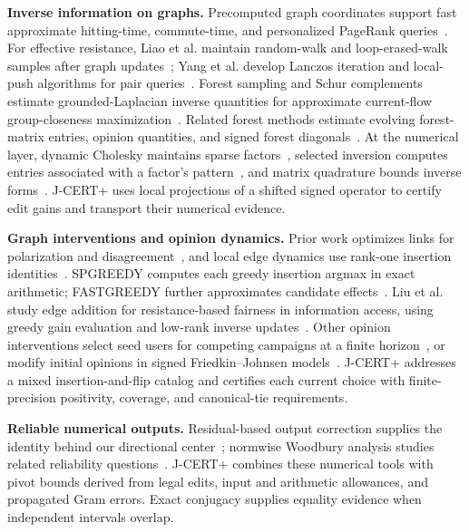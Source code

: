 \textbf{Inverse information on graphs.} Precomputed graph coordinates support fast approximate hitting-time, commute-time, and personalized PageRank queries~\cite{zhao2013randomwalk}. For effective resistance, Liao et al. maintain random-walk and loop-erased-walk samples after graph updates~\cite{liao2025resistance}; Yang et al. develop Lanczos iteration and local-push algorithms for pair queries~\cite{yang2026resistance}. Forest sampling and Schur complements estimate grounded-Laplacian inverse quantities for approximate current-flow group-closeness maximization~\cite{xia2025groupcloseness}. Related forest methods estimate evolving forest-matrix entries, opinion quantities, and signed forest diagonals~\cite{sun2024evolving,sun2025opinion,sun2026signed}. At the numerical layer, dynamic Cholesky maintains sparse factors~\cite{davis2009dynamic}, selected inversion computes entries associated with a factor's pattern~\cite{lin2011selinv}, and matrix quadrature bounds inverse forms~\cite{li2016quadrature}. J-CERT+ uses local projections of a shifted signed operator to certify edit gains and transport their numerical evidence.

\textbf{Graph interventions and opinion dynamics.} Prior work optimizes links for polarization and disagreement~\cite{musco2018polarization,zhu2021polarization}, and local edge dynamics use rank-one insertion identities~\cite{bhalla2023local}. SPGREEDY computes each greedy insertion argmax in exact arithmetic; FASTGREEDY further approximates candidate effects~\cite{zhu2021polarization}. Liu et al. study edge addition for resistance-based fairness in information access, using greedy gain evaluation and low-rank inverse updates~\cite{liu2026accessfairness}. Other opinion interventions select seed users for competing campaigns at a finite horizon~\cite{saha2025voting}, or modify initial opinions in signed Friedkin--Johnsen models~\cite{zhou2024signedfj}. J-CERT+ addresses a mixed insertion-and-flip catalog and certifies each current choice with finite-precision positivity, coverage, and canonical-tie requirements.

\textbf{Reliable numerical outputs.} Residual-based output correction supplies the identity behind our directional center~\cite{BalabanovNouy2019}; normwise Woodbury analysis studies related reliability questions~\cite{MaEtAl2026}. J-CERT+ combines these numerical tools with pivot bounds derived from legal edits, input and arithmetic allowances, and propagated Gram errors. Exact conjugacy supplies equality evidence when independent intervals overlap.
